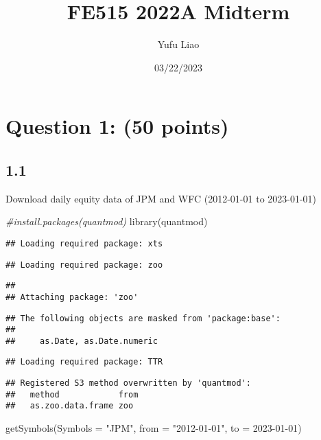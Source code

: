 \documentclass[
]{article}
\title{FE515 2022A Midterm}
\author{Yufu Liao}
\date{03/22/2023}
\newenvironment{Shaded}{\begin{snugshade}}{\end{snugshade}}
\newcommand{\AttributeTok}[1]{\textcolor[rgb]{0.77,0.63,0.00}{#1}}
\newcommand{\CommentTok}[1]{\textcolor[rgb]{0.56,0.35,0.01}{\textit{#1}}}
\newcommand{\FunctionTok}[1]{\textcolor[rgb]{0.00,0.00,0.00}{#1}}
\newcommand{\NormalTok}[1]{#1}
\newcommand{\StringTok}[1]{\textcolor[rgb]{0.31,0.60,0.02}{#1}}
\begin{document}
\maketitle

\hypertarget{question-1-50-points}{%
\section{Question 1: (50 points)}\label{question-1-50-points}}

\hypertarget{section}{%
\subsection{1.1}\label{section}}

Download daily equity data of JPM and WFC (2012-01-01 to 2023-01-01)

\begin{Shaded}
\begin{Highlighting}[]
\CommentTok{\#install.packages(\textquotesingle{}quantmod\textquotesingle{})}
\FunctionTok{library}\NormalTok{(quantmod)}
\end{Highlighting}
\end{Shaded}

\begin{verbatim}
## Loading required package: xts
\end{verbatim}

\begin{verbatim}
## Loading required package: zoo
\end{verbatim}

\begin{verbatim}
## 
## Attaching package: 'zoo'
\end{verbatim}

\begin{verbatim}
## The following objects are masked from 'package:base':
## 
##     as.Date, as.Date.numeric
\end{verbatim}

\begin{verbatim}
## Loading required package: TTR
\end{verbatim}

\begin{verbatim}
## Registered S3 method overwritten by 'quantmod':
##   method            from
##   as.zoo.data.frame zoo
\end{verbatim}

\begin{Shaded}
\begin{Highlighting}[]
\FunctionTok{getSymbols}\NormalTok{(}\AttributeTok{Symbols =} \StringTok{"JPM"}\NormalTok{, }\AttributeTok{from =} \StringTok{"2012{-}01{-}01"}\NormalTok{, }\AttributeTok{to =} \StringTok{\textquotesingle{}2023{-}01{-}01\textquotesingle{}}\NormalTok{)}
\end{Highlighting}
\end{Shaded}
\end{document}
